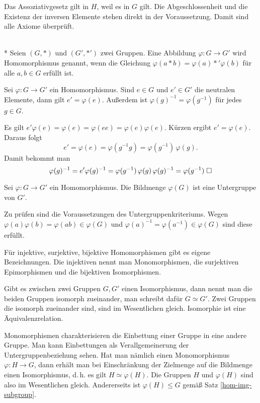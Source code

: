 Das Assoziativgesetz gilt in $H$, weil es in $G$ gilt.
Die Abgeschlossenheit und die Existenz der inversen Elemente
stehen direkt in der Voraussetzung. Damit sind alle Axiome
überprüft.\;\qedsymbol

\begin{Definition}\mbox{}\\*
Seien $(G,*)$ und $(G',*')$ zwei Gruppen. Eine Abbildung
$\varphi\colon G\to G'$ wird Homomorphismus genannt, wenn die
Gleichung
$\varphi(a*b) = \varphi(a)*'\varphi(b)$
für alle $a,b\in G$ erfüllt ist.
\end{Definition}

\begin{Satz} Sei $\varphi\colon G\to G'$ ein Homomorphismus.
Sind $e\in G$ und $e'\in G'$ die neutralen Elemente, dann gilt
$e'=\varphi(e)$. Außerdem ist $\varphi(g)^{-1}=\varphi(g^{-1})$
für jedes $g\in G$.
\end{Satz}
 Es gilt
$e'\varphi(e) = \varphi(e) = \varphi(ee) = \varphi(e)\varphi(e)$.
Kürzen ergibt $e'=\varphi(e)$. Daraus folgt
\[e' = \varphi(e) = \varphi(g^{-1}g) = \varphi(g^{-1})\,\varphi(g).\]
Damit bekommt man
\[\varphi(g)^{-1} = e'\varphi(g)^{-1}
= \varphi(g^{-1})\,\varphi(g)\,\varphi(g)^{-1}
= \varphi(g^{-1})\;\Box\]

\begin{Satz}\label{hom-img-subgroup}
Sei $\varphi\colon G\to G'$ ein Homomorphismus. Die Bildmenge
$\varphi(G)$ ist eine Untergruppe von $G'$.
\end{Satz}
 Zu prüfen sind die Voraussetzungen des
Untergruppenkriteriums. Wegen $\varphi(a)\varphi(b)
= \varphi(ab)\in\varphi(G)$ und $\varphi(a)^{-1}
= \varphi(a^{-1})\in\varphi(G)$ sind diese erfüllt.\;\qedsymbol

Für injektive, surjektive, bijektive Homomorphismen gibt es
eigene Bezeichnungen. Die injektiven nennt man Monomorphismen,
die surjektiven Epimorphismen und die bijektiven Isomorphismen.

Gibt es zwischen zwei Gruppen $G,G'$ einen Isomorphismus, dann nennt
man die beiden Gruppen isomorph zueinander, man schreibt dafür
$G\simeq G'$. Zwei Gruppen die isomorph zueinander sind, sind
im Wesentlichen gleich. Isomorphie ist eine Äquivalenzrelation.

Monomorphismen charakterisieren die Einbettung einer Gruppe
in eine andere Gruppe. Man kann Einbettungen als Verallgemeinerung
der Untergruppenbeziehung sehen. Hat man nämlich einen Monomorphismus
$\varphi\colon H\to G$, dann erhält man bei Einschränkung der
Zielmenge auf die Bildmenge einen Isomorphismus, d.\,h. es gilt
$H\simeq\varphi(H)$. Die Gruppen $H$ und $\varphi(H)$ sind also im
Wesentlichen gleich. Andererseits ist $\varphi(H)\le G$ gemäß Satz
\ref{hom-img-subgroup}.


